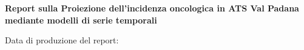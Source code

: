 \begin{titlepage}
    \centering

 \vspace*{4.2cm}

    {\Huge\bfseries
    Report sulla Proiezione dell’incidenza oncologica
    in ATS Val Padana mediante modelli di serie temporali
    \par}

    \vspace{1.5cm}
 
    {\Huge\bfseries \reporttitle \par}


    \vspace{4.2cm}

     

    \vfill

    \begin{flushright}
        \small
        Data di produzione del report:\\
        \textbf{\datareport}
    \end{flushright}

\end{titlepage}